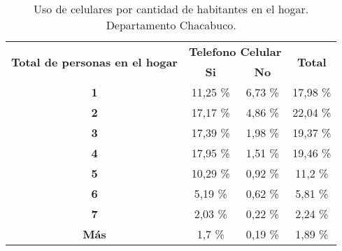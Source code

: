 \begin{table}[H]
  \centering
  \tiny

    \begin{tabular}{|c|c|c|c|}
    \hline
    \multirow{2}[4]{*}{\textcolor[rgb]{ .122,  .286,  .49}{\textbf{Total de personas en el hogar}}} &
      \multicolumn{2}{c|}{\textcolor[rgb]{ .122,  .286,  .49}{\textbf{Telefono Celular}}} &
      \multicolumn{1}{c|}{\multirow{2}[4]{*}{\textcolor[rgb]{ .122,  .286,  .49}{\textbf{Total}}}}
      \bigstrut\\
\cline{2-3}     &
      \textcolor[rgb]{ .122,  .286,  .49}{\textbf{Si}} &
      \textcolor[rgb]{ .122,  .286,  .49}{\textbf{No}} &
      
      \bigstrut\\
    \hline
    \textbf{1} &
      11,25 \% &
      6,73 \% &
      17,98 \%
      \bigstrut\\
    \hline
    \textbf{2} &
      17,17 \% &
      4,86 \% &
      22,04 \%
      \bigstrut\\
    \hline
    \textbf{3} &
      17,39 \% &
      1,98 \% &
      19,37 \%
      \bigstrut\\
    \hline
    \textbf{4} &
      17,95 \% &
      1,51 \% &
      19,46 \%
      \bigstrut\\
    \hline
    \textbf{5} &
      10,29 \% &
      0,92 \% &
      11,2 \%
      \bigstrut\\
    \hline
    \textbf{6} &
      5,19 \% &
      0,62 \% &
      5,81 \%
      \bigstrut\\
    \hline
    \textbf{7} &
      2,03 \% &
      0,22 \% &
      2,24 \%
      \bigstrut\\
    \hline
    \textbf{Más} &
      1,7 \% &
      0,19 \% &
      1,89 \%
      \bigstrut\\
    \hline
    \end{tabular}%
  \caption{Uso de celulares por cantidad de habitantes en el hogar. Departamento Chacabuco.}
  \label{tab:celular}%
\end{table}%

